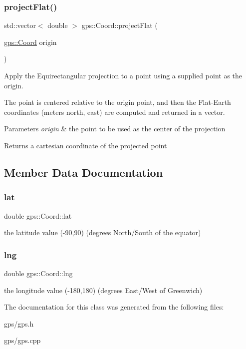 \subsubsection{\texorpdfstring{project\+Flat()}{projectFlat()}}
{\footnotesize\ttfamily std\+::vector$<$ double $>$ gps\+::\+Coord\+::project\+Flat (\begin{DoxyParamCaption}\item[{\hyperlink{classgps_1_1Coord}{gps\+::\+Coord}}]{origin }\end{DoxyParamCaption})}

Apply the Equirectangular projection to a point using a supplied point as the origin.

The point is centered relative to the origin point, and then the Flat-\/\+Earth coordinates (meters north, east) are computed and returned in a vector.


\begin{DoxyParams}{Parameters}
{\em origin} & the point to be used as the center of the projection \\
\hline
\end{DoxyParams}
\begin{DoxyReturn}{Returns}
a cartesian coordinate of the projected point 
\end{DoxyReturn}


\subsection{Member Data Documentation}
\mbox{\label{classgps_1_1Coord_a17cbbd7580a83c42f650b8f93e14d98e}} 
\subsubsection{\texorpdfstring{lat}{lat}}
{\footnotesize\ttfamily double gps\+::\+Coord\+::lat}

the latitude value (-\/90,90) (degrees North/\+South of the equator) \mbox{\label{classgps_1_1Coord_abca98aaabe2dc3cf50ebdd687c2f47e8}} 
\subsubsection{\texorpdfstring{lng}{lng}}
{\footnotesize\ttfamily double gps\+::\+Coord\+::lng}

the longitude value (-\/180,180) (degrees East/\+West of Greenwich) 

The documentation for this class was generated from the following files\+:\begin{DoxyCompactItemize}
\item 
gps/gps.\+h\item 
gps/gps.\+cpp\end{DoxyCompactItemize}

